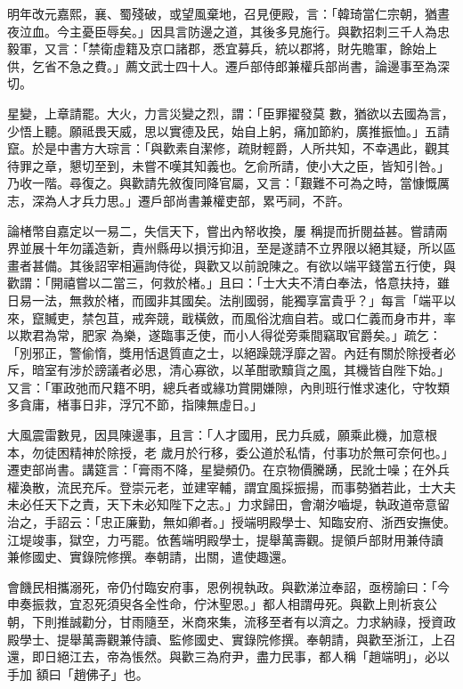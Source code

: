 \begin{pinyinscope}
 明年改元嘉熙，襄、蜀殘破，或望風棄地，召見便殿，言：「韓琦當仁宗朝，猶晝夜泣血。今主憂臣辱矣。」因具言防邊之道，其後多見施行。與歡招刺三千人為忠毅軍，又言：「禁衛虛籍及京口諸郡，悉宜募兵，統以郡將，財先贍軍，餘始上供，乞省不急之費。」薦文武士四十人。遷戶部侍郎兼權兵部尚書，論邊事至為深切。



 星變，上章請罷。大火，力言災變之烈，謂：「臣罪擢發莫
 數，猶欲以去國為言，少悟上聽。願祗畏天威，思以實德及民，始自上躬，痛加節約，廣推振恤。」五請竄。於是中書方大琮言：「與歡素自潔修，疏財輕爵，人所共知，不幸遇此，觀其待罪之章，懇切至到，未嘗不嘆其知義也。乞俞所請，使小大之臣，皆知引咎。」乃收一階。尋復之。與歡請先敘復同降官屬，又言：「艱難不可為之時，當慷慨厲志，深為人才兵力思。」遷戶部尚書兼權吏部，累丐祠，不許。



 論楮幣自嘉定以一易二，失信天下，嘗出內帑收換，屢
 稱提而折閱益甚。嘗請兩界並展十年勿議造新，責州縣毋以損污抑沮，至是遂請不立界限以絕其疑，所以區畫者甚備。其後詔宰相遍詢侍從，與歡又以前說陳之。有欲以端平錢當五行使，與歡謂：「開禧嘗以二當三，何救於楮。」且曰：「士大夫不清白奉法，恪意扶持，雖日易一法，無救於楮，而國非其國矣。法削國弱，能獨享富貴乎？」每言「端平以來，竄贓吏，禁包苴，戒奔競，戢橫斂，而風俗沈痼自若。或口仁義而身市井，率以欺君為常，肥家
 為樂，遂臨事乏使，而小人得從旁乘間竊取官爵矣。」疏乞：「別邪正，警偷惰，獎用恬退質直之士，以絕躁競浮靡之習。內廷有關於除授者必斥，暗室有涉於謗議者必思，清心寡欲，以革酣歌黷貨之風，其機皆自陛下始。」又言：「軍政弛而尺籍不明，總兵者或緣功賞開嫌隙，內則班行惟求速化，守牧類多貪庸，楮事日非，浮冗不節，指陳無虛日。」



 大風震雷數見，因具陳邊事，且言：「人才國用，民力兵威，願乘此機，加意根本，勿徒困精神於除授，老
 歲月於行移，委公道於私情，付事功於無可奈何也。」遷吏部尚書。講筵言：「膏雨不降，星變頻仍。在京物價騰踴，民訛士噪；在外兵權渙散，流民充斥。登崇元老，並建宰輔，謂宜風採振揚，而事勢猶若此，士大夫未必任天下之責，天下未必知陛下之志。」力求歸田，會潮汐嚙堤，執政道帝意留治之，手詔云：「忠正廉勤，無如卿者。」授端明殿學士、知臨安府、浙西安撫使。江堤竣事，獄空，力丐罷。依舊端明殿學士，提舉萬壽觀。提領戶部財用兼侍讀
 兼修國史、實錄院修撰。奉朝請，出關，遣使趣還。



 會饑民相攜溺死，帝仍付臨安府事，恩例視執政。與歡涕泣奉詔，亟榜諭曰：「今申奏振救，宜忍死須臾各全性命，佇沐聖恩。」都人相謂毋死。與歡上則祈哀公朝，下則推誠勸分，甘雨隨至，米商來集，流移至者有以濟之。力求納祿，授資政殿學士、提舉萬壽觀兼侍讀、監修國史、實錄院修撰。奉朝請，與歡至浙江，上召還，即日絕江去，帝為悵然。與歡三為府尹，盡力民事，都人稱「趙端明」，必以手加
 額曰「趙佛子」也。




\end{pinyinscope}
